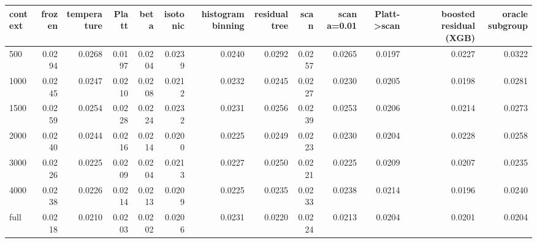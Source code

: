 \begin{tabular}{lrrrrrrrrrrrr}
\toprule
context & frozen & temperature & Platt & beta & isotonic & histogram binning & residual tree & scan & scan a=0.01 & Platt->scan & boosted residual (XGB) & oracle subgroup \\
\midrule
500 & 0.0294 & 0.0268 & 0.0197 & 0.0204 & 0.0239 & 0.0240 & 0.0292 & 0.0257 & 0.0265 & 0.0197 & 0.0227 & 0.0322 \\
1000 & 0.0245 & 0.0247 & 0.0210 & 0.0208 & 0.0212 & 0.0232 & 0.0245 & 0.0227 & 0.0230 & 0.0205 & 0.0198 & 0.0281 \\
1500 & 0.0259 & 0.0254 & 0.0228 & 0.0224 & 0.0232 & 0.0231 & 0.0256 & 0.0239 & 0.0253 & 0.0206 & 0.0214 & 0.0273 \\
2000 & 0.0240 & 0.0244 & 0.0216 & 0.0214 & 0.0200 & 0.0225 & 0.0249 & 0.0223 & 0.0230 & 0.0204 & 0.0228 & 0.0258 \\
3000 & 0.0226 & 0.0225 & 0.0209 & 0.0204 & 0.0213 & 0.0227 & 0.0250 & 0.0221 & 0.0225 & 0.0209 & 0.0207 & 0.0235 \\
4000 & 0.0238 & 0.0226 & 0.0214 & 0.0213 & 0.0209 & 0.0225 & 0.0235 & 0.0233 & 0.0238 & 0.0214 & 0.0196 & 0.0240 \\
full & 0.0218 & 0.0210 & 0.0203 & 0.0202 & 0.0206 & 0.0231 & 0.0220 & 0.0224 & 0.0213 & 0.0204 & 0.0201 & 0.0204 \\
\bottomrule
\end{tabular}
